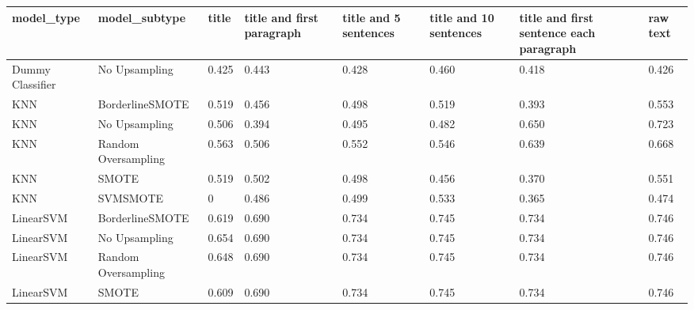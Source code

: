 \begin{tabular}{llllllll}
\toprule
                  model\_type &       model\_subtype & title & title and first paragraph & title and 5 sentences & title and 10 sentences & title and first sentence each paragraph & raw text \\
\midrule
            Dummy Classifier &       No Upsampling & 0.425 &                     0.443 &                 0.428 &                  0.460 &                                   0.418 &    0.426 \\
                         KNN &     BorderlineSMOTE & 0.519 &                     0.456 &                 0.498 &                  0.519 &                                   0.393 &    0.553 \\
                         KNN &       No Upsampling & 0.506 &                     0.394 &                 0.495 &                  0.482 &                                   0.650 &    0.723 \\
                         KNN & Random Oversampling & 0.563 &                     0.506 &                 0.552 &                  0.546 &                                   0.639 &    0.668 \\
                         KNN &               SMOTE & 0.519 &                     0.502 &                 0.498 &                  0.456 &                                   0.370 &    0.551 \\
                         KNN &            SVMSMOTE &     0 &                     0.486 &                 0.499 &                  0.533 &                                   0.365 &    0.474 \\
                   LinearSVM &     BorderlineSMOTE & 0.619 &                     0.690 &                 0.734 &                  0.745 &                                   0.734 &    0.746 \\
                   LinearSVM &       No Upsampling & 0.654 &                     0.690 &                 0.734 &                  0.745 &                                   0.734 &    0.746 \\
                   LinearSVM & Random Oversampling & 0.648 &                     0.690 &                 0.734 &                  0.745 &                                   0.734 &    0.746 \\
                   LinearSVM &               SMOTE & 0.609 &                     0.690 &                 0.734 &                  0.745 &                                   0.734 &    0.746 \\

\end{tabular}

